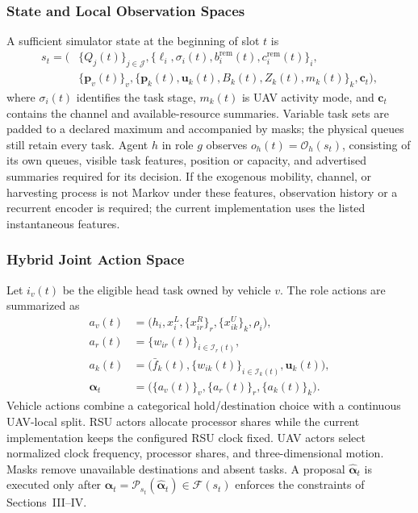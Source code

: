 \documentclass[journal]{IEEEtran}
\begin{document}
\subsubsection{State and Local Observation Spaces}
A sufficient simulator state at the beginning of slot $t$ is
\begin{equation}
\begin{aligned}
s_t=\big(&\{Q_j(t)\}_{j\in\mathcal J},
\{\ell_i,\sigma_i(t),b_i^{\mathrm{rem}}(t),c_i^{\mathrm{rem}}(t)\}_i,\\
&\{\boldsymbol p_v(t)\}_v,\{\boldsymbol p_k(t),\boldsymbol u_k(t),
B_k(t),Z_k(t),m_k(t)\}_k,\boldsymbol c_t\big),
\end{aligned}
\label{eq:mdp_state}
\end{equation}
where $\sigma_i(t)$ identifies the task stage, $m_k(t)$ is UAV activity mode,
and $\boldsymbol c_t$ contains the channel and available-resource summaries.
Variable task sets are padded to a declared maximum and accompanied by masks;
the physical queues still retain every task.  Agent $h$ in role $g$ observes
$o_h(t)=\mathcal O_h(s_t)$, consisting of its own queues, visible task
features, position or capacity, and advertised summaries required for its
decision.  If the exogenous mobility, channel, or harvesting process is not
Markov under these features, observation history or a recurrent encoder is
required; the current implementation uses the listed instantaneous features.

\subsubsection{Hybrid Joint Action Space}
Let $i_v(t)$ be the eligible head task owned by vehicle $v$.  The role actions
are summarized as
\begin{equation}
\begin{aligned}
a_v(t)&=\big(h_i,x_i^L,\{x_{ir}^R\}_r,\{x_{ik}^U\}_k,\rho_i\big),\\
a_r(t)&=\{w_{ir}(t)\}_{i\in\mathcal I_r(t)},\\
a_k(t)&=\big(\bar f_k(t),\{w_{ik}(t)\}_{i\in\mathcal I_k(t)},
\boldsymbol u_k(t)\big),\\
\boldsymbol\alpha_t&=\big(\{a_v(t)\}_v,\{a_r(t)\}_r,\{a_k(t)\}_k\big).
\end{aligned}
\label{eq:mdp_action}
\end{equation}
Vehicle actions combine a categorical hold/destination choice with a
continuous UAV-local split.  RSU actors allocate processor shares while the
current implementation keeps the configured RSU clock fixed.  UAV actors
select normalized clock frequency, processor shares, and three-dimensional
motion.  Masks remove unavailable destinations and absent tasks.  A proposal
$\widehat{\boldsymbol\alpha}_t$ is executed only after
$\boldsymbol\alpha_t=\mathscr P_{s_t}(\widehat{\boldsymbol\alpha}_t)
\in\mathcal F(s_t)$ enforces the constraints of Sections~III--IV.
\end{document}
